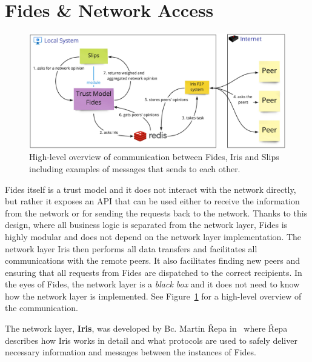 \section{Fides \& Network Access}
\label{sec:fides-and-network-access}

\begin{figure}[ht]
    \centering
    \includegraphics[width=1.0\textwidth]{assets/communication_architecture.jpeg}
    \caption{High-level overview of communication between Fides, Iris and Slips including examples of messages that sends to each other.}
    \label{fig:fides-api-network}
\end{figure}

Fides itself is a trust model and it does not interact with the network directly, but rather it exposes an API that can be used either to receive the information from the network or for sending the requests back to the network.
Thanks to this design, where all business logic is separated from the network layer, Fides is highly modular and does not depend on the network layer implementation.
The network layer Iris then performs all data transfers and facilitates all communications with the remote peers.
It also facilitates finding new peers and ensuring that all requests from Fides are dispatched to the correct recipients.
In the eyes of Fides, the network layer is a \textit{black box} and it does not need to know how the network layer is implemented.
See Figure~\ref{fig:fides-api-network} for a high-level overview of the communication.

The network layer, \textbf{Iris}, was developed by Bc. Martin Řepa in~\cite{nl} where Řepa describes how Iris works in detail and what protocols are used to safely deliver necessary information and messages between the instances of Fides.